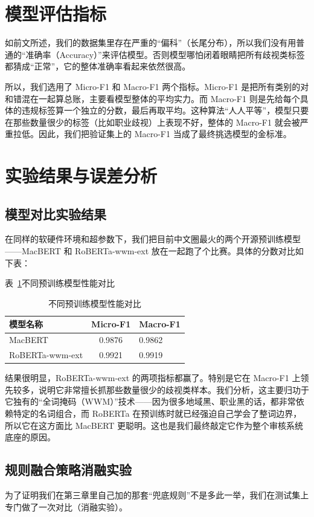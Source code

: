 \documentclass[twoside]{thesis-cls-Miya} %
\begin{document}
\section{模型评估指标}
如前文所述，我们的数据集里存在严重的“偏科”（长尾分布），所以我们没有用普通的“准确率（Accuracy）”来评估模型。否则模型哪怕闭着眼睛把所有歧视类标签都猜成“正常”，它的整体准确率看起来依然很高。

所以，我们选用了 Micro-F1 和 Macro-F1 两个指标。Micro-F1 是把所有类别的对和错混在一起算总账，主要看模型整体的平均实力。而 Macro-F1 则是先给每个具体的违规标签算一个独立的分数，最后再取平均。这种算法“人人平等”，模型只要在那些数量很少的标签（比如职业歧视）上表现不好，整体的 Macro-F1 就会被严重拉低。因此，我们把验证集上的 Macro-F1 当成了最终挑选模型的金标准。

\section{实验结果与误差分析}
\subsection{模型对比实验结果}
在同样的软硬件环境和超参数下，我们把目前中文圈最火的两个开源预训练模型——MacBERT 和 RoBERTa-wwm-ext 放在一起跑了个比赛。具体的分数对比如下表：

表~\ref{tableLabel}不同预训练模型性能对比

\begin{table}[!htb]
	\centering
	\caption{不同预训练模型性能对比}
	\label{tableLabel}
	\renewcommand{\arraystretch}{1.2}
	\setlength{\tabcolsep}{1ex}
	\begin{tabular}{l c p{}}
		\toprule
		模型名称 & Micro-F1 & Macro-F1\\
		\midrule
		MacBERT & 0.9876& 0.9862 \\
		RoBERTa-wwm-ext & 0.9921 & 0.9919 \\
		\bottomrule 
	\end{tabular}
\end{table}

结果很明显，RoBERTa-wwm-ext 的两项指标都赢了。特别是它在 Macro-F1 上领先较多，说明它非常擅长抓那些数量很少的歧视类样本。我们分析，这主要归功于它独有的“全词掩码（WWM）”技术——因为很多地域黑、职业黑的话，都非常依赖特定的名词组合，而 RoBERTa 在预训练时就已经强迫自己学会了整词边界，所以它在这方面比 MacBERT 更聪明。这也是我们最终敲定它作为整个审核系统底座的原因。

\subsection{规则融合策略消融实验}
为了证明我们在第三章里自己加的那套“兜底规则”不是多此一举，我们在测试集上专门做了一次对比（消融实验）。
\end{document}
